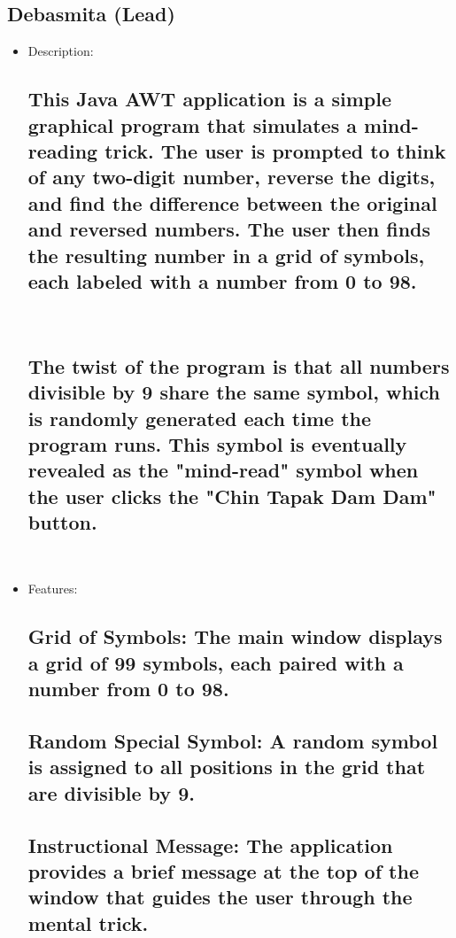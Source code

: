 \documentclass{article}
\begin{document}
\subsection*{Debasmita (Lead)}
\begin{itemize}
    \subsection*{Mind Reading Program Using Java:}


    \item Description: 
    
    \subsection*{This Java AWT application is a simple graphical program that simulates a mind-reading trick. The user is prompted to think of any two-digit number, reverse the digits, and find the difference between the original and reversed numbers. The user then finds the resulting number in a grid of symbols, each labeled with a number from 0 to 98.}\\

    \subsection*{The twist of the program is that all numbers divisible by 9 share the same symbol, which is randomly generated each time the program runs. This symbol is eventually revealed as the "mind-read" symbol when the user clicks the "Chin Tapak Dam Dam" button.}\\

    \item Features: 
    \subsection*{Grid of Symbols: The main window displays a grid of 99 symbols, each paired with a number from 0 to 98.}
    \subsection*{Random Special Symbol: A random symbol is assigned to all positions in the grid that are divisible by 9.}
    \subsection*{Instructional Message: The application provides a brief message at the top of the window that guides the user through the mental trick.}

\end{itemize}
\end{document}
